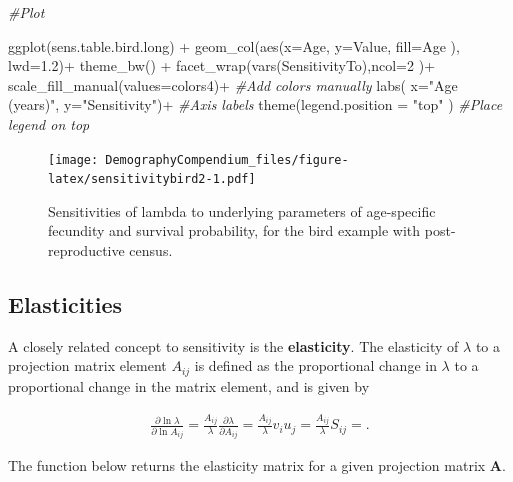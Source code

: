 \documentclass[
]{book}
\newenvironment{Shaded}{\begin{snugshade}}{\end{snugshade}}
\newcommand{\AttributeTok}[1]{\textcolor[rgb]{0.77,0.63,0.00}{#1}}
\newcommand{\CommentTok}[1]{\textcolor[rgb]{0.56,0.35,0.01}{\textit{#1}}}
\newcommand{\DecValTok}[1]{\textcolor[rgb]{0.00,0.00,0.81}{#1}}
\newcommand{\FloatTok}[1]{\textcolor[rgb]{0.00,0.00,0.81}{#1}}
\newcommand{\FunctionTok}[1]{\textcolor[rgb]{0.00,0.00,0.00}{#1}}
\newcommand{\NormalTok}[1]{#1}
\newcommand{\SpecialCharTok}[1]{\textcolor[rgb]{0.00,0.00,0.00}{#1}}
\newcommand{\StringTok}[1]{\textcolor[rgb]{0.31,0.60,0.02}{#1}}
\begin{document}
\begin{Shaded}
\begin{Highlighting}[]
\CommentTok{\#Plot}

\FunctionTok{ggplot}\NormalTok{(sens.table.bird.long) }\SpecialCharTok{+} 
  \FunctionTok{geom\_col}\NormalTok{(}\FunctionTok{aes}\NormalTok{(}\AttributeTok{x=}\NormalTok{Age, }\AttributeTok{y=}\NormalTok{Value, }\AttributeTok{fill=}\NormalTok{Age ), }\AttributeTok{lwd=}\FloatTok{1.2}\NormalTok{)}\SpecialCharTok{+}
  \FunctionTok{theme\_bw}\NormalTok{() }\SpecialCharTok{+}
  \FunctionTok{facet\_wrap}\NormalTok{(}\FunctionTok{vars}\NormalTok{(SensitivityTo),}\AttributeTok{ncol=}\DecValTok{2}\NormalTok{ )}\SpecialCharTok{+}
  \FunctionTok{scale\_fill\_manual}\NormalTok{(}\AttributeTok{values=}\NormalTok{colors4)}\SpecialCharTok{+} \CommentTok{\#Add colors manually}
  \FunctionTok{labs}\NormalTok{( }\AttributeTok{x=}\StringTok{"Age (years)"}\NormalTok{, }\AttributeTok{y=}\StringTok{"Sensitivity"}\NormalTok{)}\SpecialCharTok{+} \CommentTok{\#Axis labels}
  \FunctionTok{theme}\NormalTok{(}\AttributeTok{legend.position =} \StringTok{"top"}\NormalTok{ ) }\CommentTok{\#Place legend on top}
\end{Highlighting}
\end{Shaded}

\begin{figure}
\centering
\texttt{[image: DemographyCompendium\_files/figure-latex/sensitivitybird2-1.pdf]}
\caption{\label{fig:sensitivitybird2}Sensitivities of lambda to underlying parameters of age-specific fecundity and survival probability, for the bird example with post-reproductive census.}
\end{figure}

\hypertarget{elasticities}{%
\subsection{Elasticities}\label{elasticities}}

A closely related concept to sensitivity is the \textbf{elasticity}. The elasticity of \(\lambda\) to a projection matrix element \(A_{ij}\) is defined as the proportional change in \(\lambda\) to a proportional change in the matrix element, and is given by

\begin{align} 
\frac{\partial  \ln \lambda}{\partial \ln A_{ij}} =\frac{A_{ij}}{\lambda}\frac{\partial  \lambda}{\partial A_{ij}}=\frac{A_{ij}}{\lambda} v_{i}u_{j}=\frac{A_{ij}}{\lambda} S_{ij}=.
\end{align}

The function below returns the elasticity matrix for a given projection matrix \(\mathbf{A}\).
\end{document}
